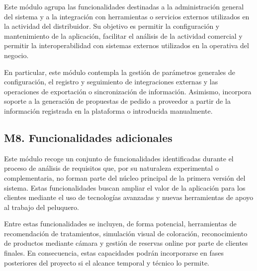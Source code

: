 Este módulo agrupa las funcionalidades destinadas a la administración general del sistema y a la integración con herramientas o servicios externos utilizados en la actividad del distribuidor. Su objetivo es permitir la configuración y mantenimiento de la aplicación, facilitar el análisis de la actividad comercial y permitir la interoperabilidad con sistemas externos utilizados en la operativa del negocio.

En particular, este módulo contempla la gestión de parámetros generales de configuración, el registro y seguimiento de integraciones externas y las operaciones de exportación o sincronización de información. Asimismo, incorpora soporte a la generación de propuestas de pedido a proveedor a partir de la información registrada en la plataforma o introducida manualmente.

\subsection{M8. Funcionalidades adicionales}

Este módulo recoge un conjunto de funcionalidades identificadas durante el proceso de análisis de requisitos que, por su naturaleza experimental o complementaria, no forman parte del núcleo principal de la primera versión del sistema. Estas funcionalidades buscan ampliar el valor de la aplicación para los clientes mediante el uso de tecnologías avanzadas y nuevas herramientas de apoyo al trabajo del peluquero.

Entre estas funcionalidades se incluyen, de forma potencial, herramientas de recomendación de tratamientos, simulación visual de coloración, reconocimiento de productos mediante cámara y gestión de reservas online por parte de clientes finales. En consecuencia, estas capacidades podrán incorporarse en fases posteriores del proyecto si el alcance temporal y técnico lo permite.